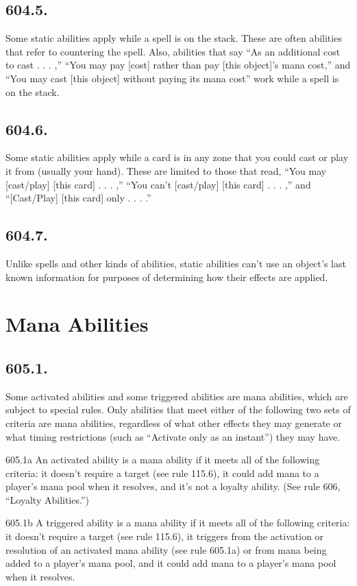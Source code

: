 \subsection*{604.5.}
Some static abilities apply while a spell is on the stack. These are often abilities that refer to countering the spell. Also, abilities that say “As an additional cost to cast . . . ,” “You may pay [cost] rather than pay [this object]’s mana cost,” and “You may cast [this object] without paying its mana cost” work while a spell is on the stack.

\subsection*{604.6.}
Some static abilities apply while a card is in any zone that you could cast or play it from (usually your hand). These are limited to those that read, “You may [cast/play] [this card] . . . ,” “You can’t [cast/play] [this card] . . . ,” and “[Cast/Play] [this card] only . . . .”

\subsection*{604.7.}
Unlike spells and other kinds of abilities, static abilities can’t use an object’s last known information for purposes of determining how their effects are applied.

\section{Mana Abilities}
\subsection*{605.1.}
Some activated abilities and some triggered abilities are mana abilities, which are subject to special rules. Only abilities that meet either of the following two sets of criteria are mana abilities, regardless of what other effects they may generate or what timing restrictions (such as “Activate only as an instant”) they may have.

605.1a An activated ability is a mana ability if it meets all of the following criteria: it doesn’t require a target (see rule 115.6), it could add mana to a player’s mana pool when it resolves, and it’s not a loyalty ability. (See rule 606, “Loyalty Abilities.”)

605.1b A triggered ability is a mana ability if it meets all of the following criteria: it doesn’t require a target (see rule 115.6), it triggers from the activation or resolution of an activated mana ability (see rule 605.1a) or from mana being added to a player’s mana pool, and it could add mana to a player’s mana pool when it resolves.

